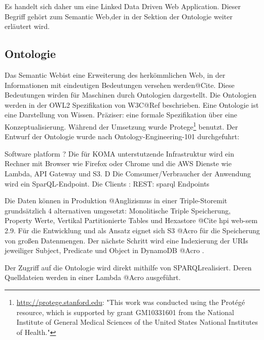 \documentclass[
12pt,
english,
ngerman,
headsepline,
twoside,
openright,
numbers=noenddot,version=first
]{scrreprt}
\begin{document}
Es handelt sich daher um eine \glqq Linked Data Driven Web Application\grqq.%
Dieser Begriff gehört zum \glqq Semantic Web\grqq,der in der Sektion der Ontologie weiter erläutert wird. 

\subsection{Ontologie}

Das \glqq Semantic Web\grqq ist eine Erweiterung des herkömmlichen Web, in der Informationen mit eindeutigen Bedeutungen versehen werden@Cite. Diese Bedeutungen wirden für Maschinen durch Ontologien dargestellt. Die Ontologien werden in der OWL2 Spezifikation von W3C@Ref beschrieben. 
Eine Ontologie ist eine Darstellung von Wissen. Präziser: eine formale Spezifikation über eine Konzeptualisierung\cite{OntoWhat}.
Während der Umsetzung wurde Protege\footnote{\url{http://protege.stanford.edu}: "This work was conducted using the Protégé resource, which is supported by grant GM10331601 from the National Institute of General Medical Sciences of the United States National Institutes of Health."} benutzt.
Der Entwurf der Ontologie wurde nach Ontology-Engineering-101 durchgefuhrt: 


Software platform ? 
Die für KOMA unterstutzende Infrastruktur wird ein Rechner mit Browser wie Firefox oder Chrome und die AWS Dienste wie Lambda, API Gateway und S3. D
Die Comsumer/Verbraucher der Anwendung wird ein SparQL-Endpoint\cite{SparqlLearn}.
Die Clients : REST: sparql Endpoints

Die Daten können in Produktion @Anglizismus in einer \glqq Triple-Store\grqq mit grundsätzlich 4 alternativen umgesetzt: Monolitische Triple Speicherung, Property Werte, Vertikal Partitionierte Tables und Hexastore @Cite hpi web-sem 2.9. 
Für die Entwicklung und als Ansatz eignet sich S3 @Acro für die Speicherung von großen Datenmengen. Der nächste Schritt wird eine Indexierung der URIs jeweiliger Subject, Predicate und Object in DynamoDB @Acro .

Der Zugriff auf die Ontologie wird direkt mithilfe von \glqq SPARQL\grqq  realisiert. Deren Quelldateien werden in einer Lambda @Acro ausgeführt.
\end{document}
